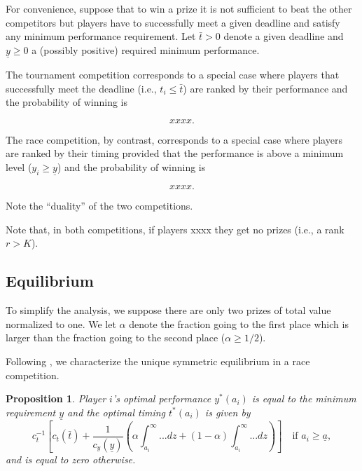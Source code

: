 \documentclass[12pt,]{article}
\newtheorem{proposition}{Proposition}
\newcommand\deadline{\bar{t}}
\newcommand\target{\underline{y}}
\newcommand\ctime{c_{t}}
\newcommand\cscore{c_{y}}
\newcommand\ability{a_i}
\newcommand\marginaltype{\underline{a}}
\begin{document}
For convenience, suppose that to win a prize it is not sufficient to
beat the other competitors but players have to successfully meet a given
deadline and satisfy any minimum performance requirement. Let
\(\deadline>0\) denote a given deadline and \(\target\geq 0\) a
(possibly positive) required minimum performance.

The tournament competition corresponds to a special case where players
that successfully meet the deadline (i.e., \(t_i\leq\deadline\)) are
ranked by their performance and the probability of winning is

\begin{equation}
  xxxx.
\end{equation}

The race competition, by contrast, corresponds to a special case where
players are ranked by their timing provided that the performance is
above a minimum level (\(y_i\geq\target\)) and the probability of
winning is

\begin{equation}
  \label{probability in a race}
  xxxx.
\end{equation}

Note the ``duality'' of the two competitions. \citep{baye2003strategic}

Note that, in both competitions, if players xxxx they get no prizes
(i.e., a rank \(r > K\)).

\subsection{Equilibrium}\label{equilibrium}

To simplify the analysis, we suppose there are only two prizes of total
value normalized to one. We let \(\alpha\) denote the fraction going to
the first place which is larger than the fraction going to the second
place (\(\alpha\geq1/2\)).

Following \citet{moldovanu2001optimal}, we characterize the unique
symmetric equilibrium in a race competition.

\begin{proposition}
Player $i$'s optimal performance $y^*(a_i)$ is equal to the minimum requirement $\target$ and the optimal timing $t^*(a_i)$ is given by
\begin{equation} 
  \label{eq: optimal time race}
  \ctime^{-1}\left[\ctime(\deadline) + \frac{1}{\cscore(\target)}\left(\alpha \int_{a_i}^{\infty} ... dz   + (1-\alpha) \int_{a_i}^{\infty} ...  dz\right)\right]
  \quad \text{if }\ability\geq\marginaltype, 
\end{equation}
and is equal to zero otherwise. 
\end{proposition}
\end{document}
